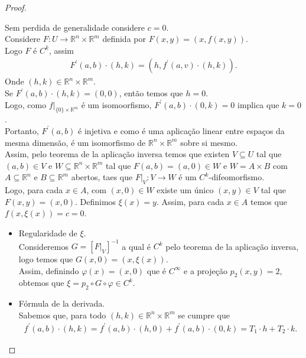 \begin{proof}
  \begin{center}
      
  \end{center}
  Sem perdida de generalidade considere $c=0$.\\
  Considere $F:U\to\mathbb{R}^{n}\times\mathbb{R}^{m}$ definida por $F(x,y)=(x,f(x,y))$.\\
  Logo $F$ é $C^{k}$, assim
  \begin{align*}
    F^{\prime}(a,b)\cdot (h,k)=(h,f^{\prime}(a,v)\cdot(h,k)).
  \end{align*}
  Onde $(h,k)\in\mathbb{R}^{n}\times\mathbb{R}^{m}$.\\
  Se $F^{\prime}(a,b)\cdot(h,k)=(0,0)$, então temos que $h=0$.\\
  Logo, como $f\big|_{\{0\}\times\mathbb{R}^{m}}$ é um isomoorfismo, $F^{\prime}(a,b)\cdot (0,k)=0$ implica que $k=0$.\\
  Portanto, $F^{\prime}(a,b)$ é injetiva e como é  uma aplicação linear entre espaços da mesma dimensão, é um isomorfismo de $\mathbb{R}^{n}\times\mathbb{R}^{m}$ sobre si mesmo.\\
  Assim, pelo teorema de la aplicação inversa temos que existen $V\subseteq U$ tal que $(a,b)\in V$ e $W\subseteq \mathbb{R}^{n}\times\mathbb{R}^{m}$ tal que $F(a,b)=(a,0)\in W$ e $W=A\times B$ com $A\subseteq \mathbb{R}^{n}$ e $B\subseteq \mathbb{R}^{m}$ abertos, taes que $F\big|_{V}:V\to W$ é um $C^{k}$-difeomorfismo.\\
  Logo, para cada $x\in A$, com $(x,0)\in W$ existe um único $(x,y)\in V$ tal que $F(x,y)=(x,0)$. Definimos $\xi(x)=y$. Assim, para cada $x\in A$ temos que $f(x,\xi(x))=c=0$.
  \begin{itemize}
    \item Regularidade de $\xi$.\\
      Consideremos $G=\left[ F\big|_{V} \right]^{-1}$ a qual é $C^{k}$ pelo teorema de la aplicação inversa, logo temos que $G(x,0)=(x,\xi(x))$.\\
      Assim, definindo $\varphi(x)=(x,0)$ que é $C^{\infty}$ e a projeção $p_2(x,y)=2$, obtemos que $\xi=p_2\circ G\circ \varphi \in C^{k}$.
    \item Fórmula de la derivada.\\
      Sabemos que, para todo $(h,k)\in\mathbb{R}^{n}\times\mathbb{R}^{m}$ se cumpre que
      \begin{align*}
        f^{\prime}(a,b)\cdot (h,k)=f^{\prime}(a,b)\cdot(h,0)+f^{\prime}(a,b)\cdot (0,k)=T_1\cdot h+T_2\cdot k.

\end{align*}
\end{itemize}
\end{proof}

